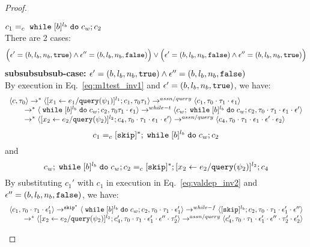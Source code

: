 {\begin{proof}
\begin{subproof}
\end{subproof}
%
\begin{subproof} $c_1 =_c \;\mathtt{while}\; [b]^{l_b} \;\mathtt{do}\; c_w;{c}_2$ 
%
\\
There are 2 cases:
$$
\Big(\mathtt{\epsilon}' = (b, l_b, n_b, \mathtt{true}) \land \mathtt{\epsilon}'' = (b, l_b, n_b, \mathtt{false}) \Big)
\lor 
\Big(\mathtt{\epsilon}' = (b, l_b, n_b, \mathtt{false}) \land \mathtt{\epsilon}'' = (b, l_b, n_b, \mathtt{true}) \Big)
$$
%
\textbf{subsubsubsub-case:} $\mathtt{\epsilon}' = (b, l_b, n_b, \mathtt{true}) \land \mathtt{\epsilon}'' = (b, l_b, n_b, \mathtt{false})$
\\
By execution in Eq.~\ref{eq:m1test_inv1} and $\mathtt{\epsilon}' = (b, l_b, n_b, \mathtt{true})$, we have:
\[
  \begin{array}{l}   
  \langle {c}, \mathtt{\tau}_0 \rangle \rightarrow^{*} 
  \langle [\mathrel{ {x}_1 \leftarrow e_1 / {\tt query}(\psi_1) }]^{l_1} ; {c}_1, \mathtt{\tau}_0 \mathtt{\tau}_1 \rangle  
  \rightarrow^{assn/query}
  \langle c_1, \mathtt{\tau}_0 \cdot \mathtt{\tau}_1 \cdot \mathtt{\epsilon}_1 \rangle 
  \\
  \qquad \rightarrow^{*} 
  \langle \;\mathtt{while}\; [b]^{l_b} \;\mathtt{do}\; c_w;{c}_2, 
  \mathtt{\tau}_0 \mathtt{\tau}_1 \cdot \mathtt{\epsilon}_1 \rangle 
  \rightarrow^{while-t} 
  \langle c_w;\;\mathtt{while}\; [b]^{l_b} \;\mathtt{do}\; c_w; c_2, \mathtt{\tau}_0 \cdot \mathtt{\tau}_1 \cdot \mathtt{\epsilon}_1 \cdot \mathtt{\epsilon}' \rangle 
  \\
  \qquad \rightarrow^{*} 
  \langle [\mathrel{ {x}_2 \leftarrow e_2 / {\tt query}(\psi_2) }]^{l_2};{c}_4, 
  \mathtt{\tau}_0 \cdot \mathtt{\tau}_1 \cdot \mathtt{\epsilon}_1 \cdot \mathtt{\epsilon}' \rangle 
  \rightarrow^{assn/query} 
  \langle {c}_4,  \mathtt{\tau}_0 \cdot \mathtt{\tau}_1 \cdot \mathtt{\epsilon}_1 \cdot \mathtt{\epsilon}' \cdot \mathtt{\epsilon}_2 \rangle 
  \end{array}
\]
% 
\[
  c_1 =_c [\mathtt{skip}]{}^*; \;\mathtt{while}\; [b]^{l_b} \;\mathtt{do}\; c_w;{c}_2
\]
and
\[
  c_w;\;\mathtt{while}\; [b]^{l_b} \;\mathtt{do}\; c_w; c_2 =_c [\mathtt{skip}]{}^*;[\mathrel{ {x}_2 \leftarrow e_2 / {\tt query}(\psi_2) }]^{l_2};{c}_4
\]
%
By substituting $c_1'$ with $c_1$ in execution in Eq.~\ref{eq:valdep_inv2} and $\mathtt{\epsilon}'' = (b, l_b, n_b, \mathtt{false})$, we have:
  \[
  \begin{array}{l}   
  \langle c_1, \mathtt{\tau}_0 \cdot \mathtt{\tau}_1 \cdot \mathtt{\epsilon}_1' \rangle 
  \rightarrow^{\mathtt{skip}^*} 
  \langle \;\mathtt{while}\; [b]^{l_b} \;\mathtt{do}\; c_w;{c}_2, \mathtt{\tau}_0 \cdot \mathtt{\tau}_1 \cdot \mathtt{\epsilon}_1' \rangle 
  \rightarrow^{while-f} 
  \langle [\mathtt{skip}]^{l_b};c_2, \mathtt{\tau}_0 \cdot \mathtt{\tau}_1 \cdot \mathtt{\epsilon}_1' \cdot \mathtt{\epsilon}'' \rangle 
  \\
  \qquad \rightarrow^{*} 
  \langle [\mathrel{ {x}_2 \leftarrow e_2 / {\tt query}(\psi_2) }]^{l_2};{c}_4', 
  \mathtt{\tau}_0 \cdot \mathtt{\tau}_1 \cdot \mathtt{\epsilon}_1' \cdot \mathtt{\epsilon}'' \cdot \mathtt{\tau}_2' \rangle
  \rightarrow^{assn/query} 
  \langle {c}_4',  \mathtt{\tau}_0 \cdot \mathtt{\tau}_1 \cdot \mathtt{\epsilon}_1' \cdot \mathtt{\epsilon}'' \cdot \mathtt{\tau}_2' \cdot \mathtt{\epsilon}_2' \rangle 

\end{array}\]
\end{subproof}
\end{proof}}
